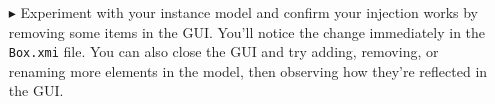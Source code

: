 \begin{itemize}
\vspace{1cm}

\item[$\blacktriangleright$] Experiment with your instance model and confirm your injection works by removing some items in the GUI.  You'll notice the change
immediately in the \texttt{Box.xmi} file. You can also close the GUI and try adding, removing, or renaming more elements in the model, then observing
how they're reflected in the GUI.

\end{itemize}
